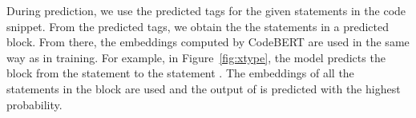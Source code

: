 During prediction, we use the predicted tags for the given statements
in the code snippet. From the predicted tags, we obtain the the
statements in a predicted  block. From there, the
embeddings computed by CodeBERT are used in the same way
as in training. For example, in Figure~\ref{fig:xtype}, the model
predicts the  block from the statement
 to the statement . The
embeddings of all the statements in the block are used
and the output of  is predicted with the highest
probability.








%
%
